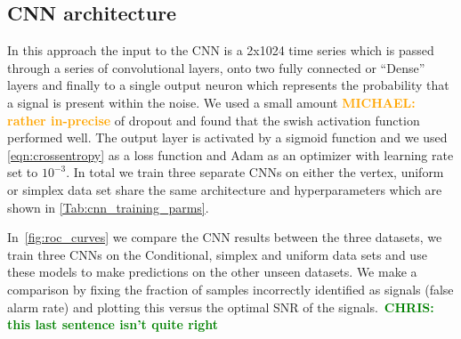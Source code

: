 \documentclass[12pt]{iopart}
\newcommand{\chris}[1]{\textbf{\textcolor{green}{CHRIS: #1}}}
\newcommand{\michael}[1]{\textbf{\textcolor{orange}{MICHAEL: #1}}}
\begin{document}
\subsection{CNN architecture}
In this approach the input to the \ac{CNN} is a 2x1024 time series which is passed through a series of convolutional layers, onto two fully connected or ``Dense'' layers and finally to a single output neuron which represents the probability that a signal is present within the noise. We used a small amount \michael{rather in-precise} of dropout and found that the swish activation \cite{ramachandran2017searching} function performed well. The output layer is activated by a sigmoid function and we used \cref{eqn:crossentropy} as a loss function and Adam as an optimizer with learning rate set to $10^{-3}$. In total we train three separate \acp{CNN} on either the vertex, uniform or simplex data set share the same architecture and hyperparameters which are shown in \cref{Tab:cnn_training_parms}.

In~\cref{fig:roc_curves} we compare the \ac{CNN} results between the three
datasets, we train three \acp{CNN} on the Conditional, simplex and uniform data sets
and use these models to make predictions on the other unseen datasets. We make
a comparison by fixing the fraction of samples incorrectly identified as
signals (false alarm rate) and plotting this versus the optimal SNR of the
signals.~\chris{this last sentence isn't quite right} 
\end{document}
